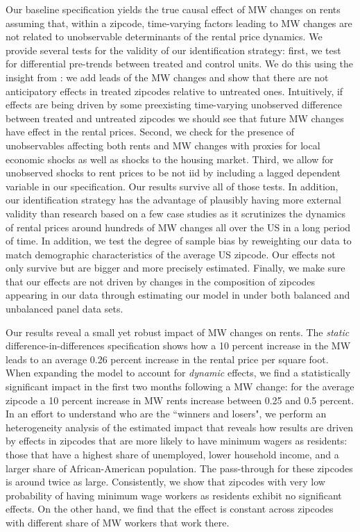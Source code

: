 Our baseline specification yields the true causal effect of MW changes on rents assuming that, 
within a zipcode, time-varying factors leading to MW changes are not related to unobservable 
determinants of the rental price dynamics. We provide several tests for the validity of our 
identification strategy: first, we test for differential pre-trends between treated and control 
units. We do this using the insight from \textcite{granger1969investigating}: we add leads of the 
MW changes and show that there are not anticipatory effects in treated zipcodes relative to 
untreated ones. Intuitively, if effects are being driven by some preexisting time-varying 
unobserved difference between treated and untreated zipcodes we should see that future MW changes 
have effect in the rental prices. Second, we check for the presence of unobservables affecting both 
rents and MW changes with proxies for local economic shocks as well as shocks to the housing market. 
Third, we allow for unobserved shocks to rent prices to be not iid by including a lagged dependent 
variable in our specification. Our results survive all of those tests. In addition, our identification 
strategy has the advantage of plausibly having more external validity than research based on a few 
case studies as it scrutinizes the dynamics of rental prices around hundreds of MW changes all over 
the US in a long period of time. In addition, we test the degree of sample bias by reweighting our 
data to match demographic characteristics of the average US zipcode. Our effects not only survive 
but are bigger and more precisely estimated. Finally, we make sure that our effects are not driven 
by changes in the composition of zipcodes appearing in our data through estimating our model in 
under both balanced and unbalanced panel data sets. 

Our results reveal a small yet robust impact of MW changes on rents. The \textit{static} 
difference-in-differences specification shows how a 10 percent increase in the MW leads to an average 
0.26 percent increase in the rental price per square foot. When expanding the model to account for 
\textit{dynamic} effects, we find a statistically significant impact in the first two months following 
a MW change: for the average zipcode a 10 percent increase in MW rents increase between 0.25 and 
0.5 percent. In an effort to understand who are the ``winners and losers", we perform an heterogeneity 
analysis of the estimated impact that reveals how results are driven by effects in zipcodes that are 
more likely to have minimum wagers as residents: those that have a highest share of unemployed, lower 
household income, and a larger share of African-American population. The pass-through for these 
zipcodes is around twice as large. Consistently, we show that zipcodes with very low probability of 
having minimum wage workers as residents exhibit no significant effects. On the other hand, we find 
that the effect is constant across zipcodes with different share of MW workers that work there.

